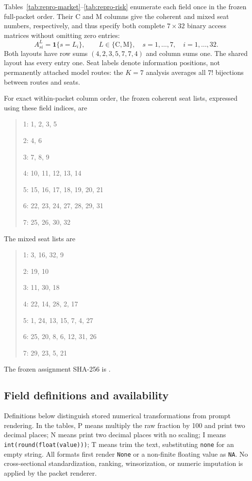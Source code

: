 Tables~\ref{tab:repro-market}--\ref{tab:repro-risk} enumerate each field once
in the frozen full-packet order. Their C and M columns give the coherent
and mixed seat numbers, respectively, and thus specify both complete
$7\times32$ binary access matrices without omitting zero entries:
\[
 A^{L}_{si}=\mathbf{1}\{s=L_i\},\qquad
 L\in\{\mathrm{C},\mathrm{M}\},\quad s=1,\ldots,7,\quad i=1,\ldots,32.
\]
Both layouts have row sums $(4,2,3,5,7,7,4)$ and column sums one. The
shared layout has every entry one. Seat labels denote information
positions, not permanently attached model routes: the $K=7$ analysis
averages all $7!$ bijections between routes and seats.

For exact within-packet column order, the frozen coherent seat lists,
expressed using these field indices, are
\begin{quote}\small
1: 1, 2, 3, 5\par
2: 4, 6\par
3: 7, 8, 9\par
4: 10, 11, 12, 13, 14\par
5: 15, 16, 17, 18, 19, 20, 21\par
6: 22, 23, 24, 27, 28, 29, 31\par
7: 25, 26, 30, 32\par
\end{quote}

The mixed seat lists are
\begin{quote}\small
1: 3, 16, 32, 9\par
2: 19, 10\par
3: 11, 30, 18\par
4: 22, 14, 28, 2, 17\par
5: 1, 24, 13, 15, 7, 4, 27\par
6: 25, 20, 8, 6, 12, 31, 26\par
7: 29, 23, 5, 21\par
\end{quote}
The frozen assignment SHA-256 is .

\subsection{Field definitions and availability}
Definitions below distinguish stored numerical transformations from
prompt rendering. In the tables, P means multiply the raw fraction by
100 and print two decimal places; N means print two decimal places with
no scaling; I means \texttt{int(round(float(value)))}; T means trim the
text, substituting \texttt{none} for an empty string. All formats first
render \texttt{None} or a non-finite floating value as \texttt{NA}.
No cross-sectional standardization, ranking, winsorization, or numeric
imputation is applied by the packet renderer.

